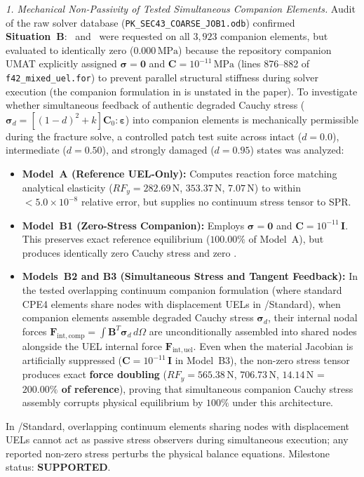\textit{1. Mechanical Non-Passivity of Tested Simultaneous Companion Elements.}
Audit of the raw solver database (\texttt{PK\_SEC43\_COARSE\_JOB1.odb}) confirmed \textbf{Situation~B}: \MISESERI\ and \MISESAVG\ were requested on all $3{,}923$ companion elements, but evaluated to identically zero ($0.000\,\mathrm{MPa}$) because the repository companion UMAT explicitly assigned $\boldsymbol{\sigma} = \mathbf{0}$ and $\mathbf{C} = 10^{-11}\,\mathrm{MPa}$ (lines 876--882 of \texttt{f42\_mixed\_uel.for}) to prevent parallel structural stiffness during solver execution (the companion formulation in \citet{pandey2025} is unstated in the paper).
To investigate whether simultaneous feedback of authentic degraded Cauchy stress ($\boldsymbol{\sigma}_d = [(1-d)^2 + k] \mathbf{C}_0 : \boldsymbol{\varepsilon}$) into companion elements is mechanically permissible during the fracture solve, a controlled patch test suite across intact ($d=0.0$), intermediate ($d=0.50$), and strongly damaged ($d=0.95$) states was analyzed:
\begin{itemize}
  \item \textbf{Model~A (Reference UEL-Only):} Computes reaction force matching analytical elasticity ($RF_y = 282.69\,\mathrm{N}$, $353.37\,\mathrm{N}$, $7.07\,\mathrm{N}$) to within $< 5.0 \times 10^{-8}$ relative error, but supplies no continuum stress tensor to \Abaqus SPR.
  \item \textbf{Model~B1 (Zero-Stress Companion):} Employs $\boldsymbol{\sigma} = \mathbf{0}$ and $\mathbf{C} = 10^{-11}\,\mathbf{I}$. This preserves exact reference equilibrium ($100.00\%$ of Model~A), but produces identically zero Cauchy stress and zero \MISESERI.
  \item \textbf{Models~B2 and B3 (Simultaneous Stress and Tangent Feedback):} In the tested overlapping continuum companion formulation (where standard CPE4 elements share nodes with displacement UELs in \Abaqus/Standard), when companion elements assemble degraded Cauchy stress $\boldsymbol{\sigma}_d$, their internal nodal forces $\mathbf{F}_{\mathrm{int},\mathrm{comp}} = \int \mathbf{B}^T \boldsymbol{\sigma}_d \, d\Omega$ are unconditionally assembled into shared nodes alongside the UEL internal force $\mathbf{F}_{\mathrm{int},\mathrm{uel}}$. Even when the material Jacobian is artificially suppressed ($\mathbf{C} = 10^{-11}\,\mathbf{I}$ in Model~B3), the non-zero stress tensor produces exact \textbf{force doubling} ($RF_y = 565.38\,\mathrm{N}$, $706.73\,\mathrm{N}$, $14.14\,\mathrm{N}$ = \textbf{$200.00\%$ of reference}), proving that simultaneous companion Cauchy stress assembly corrupts physical equilibrium by $100\%$ under this architecture.
\end{itemize}
In \Abaqus/Standard, overlapping continuum elements sharing nodes with displacement UELs cannot act as passive stress observers during simultaneous execution; any reported non-zero stress perturbs the physical balance equations. Milestone status: \textbf{SUPPORTED}.

